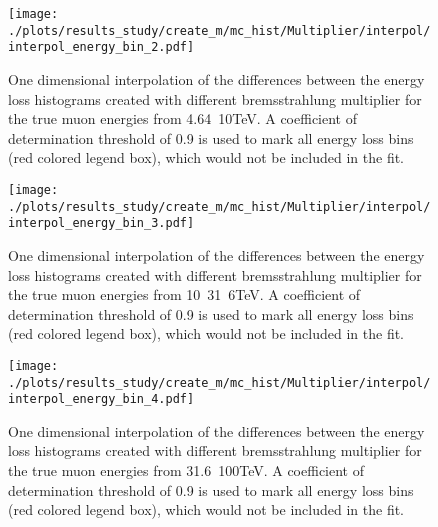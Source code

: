 \begin{figure}[H]
    \centering
    \texttt{[image: ./plots/results\_study/create\_m/mc\_hist/Multiplier/interpol/interpol\_energy\_bin\_2.pdf]}
    \caption{One dimensional interpolation of the differences between the energy loss histograms created with different bremsstrahlung multiplier for the true muon energies from \SI{4.64}{10}{TeV}. A coefficient of determination threshold of \num{0.9} is used to mark all energy loss bins (red colored legend box), which would not be included in the fit.}
    \label{fig:study_1d_interpol_mu2_mc}
\end{figure}

\begin{figure}[H]
    \centering
    \texttt{[image: ./plots/results\_study/create\_m/mc\_hist/Multiplier/interpol/interpol\_energy\_bin\_3.pdf]}
    \caption{One dimensional interpolation of the differences between the energy loss histograms created with different bremsstrahlung multiplier for the true muon energies from \SI{10}{31.6}{TeV}. A coefficient of determination threshold of \num{0.9} is used to mark all energy loss bins (red colored legend box), which would not be included in the fit.}
    \label{fig:study_1d_interpol_mu3_mc}
\end{figure}

\begin{figure}[H]
    \centering
    \texttt{[image: ./plots/results\_study/create\_m/mc\_hist/Multiplier/interpol/interpol\_energy\_bin\_4.pdf]}
    \caption{One dimensional interpolation of the differences between the energy loss histograms created with different bremsstrahlung multiplier for the true muon energies from \SI{31.6}{100}{TeV}. A coefficient of determination threshold of \num{0.9} is used to mark all energy loss bins (red colored legend box), which would not be included in the fit.}
    \label{fig:study_1d_interpol_mu4_mc}
\end{figure}

%



